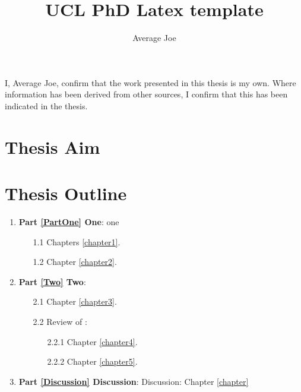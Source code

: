 \documentclass[12pt,phd ,a4paper,oneside]{ucl_thesis}
\title{UCL PhD Latex template}
\author{Average Joe}
\begin{document}
\maketitle
\nobibliography*
\newpage

I, Average Joe, confirm that the work presented in this thesis is my own. Where information has been derived from other sources, I confirm that this has been indicated in the thesis.

\begin{abstract}
	\lipsum
\end{abstract}

\begin{acknowledgements}
	\lipsum
\end{acknowledgements}

\setcounter{tocdepth}{2} 

\tableofcontents
\listoffigures
\listoftables

\chapter*{Thesis Aim}\label{ThesisAim} %
	\lipsum
	
\chapter*{Thesis Outline}\label{ThesisOutline}
	\lipsum
\begin{enumerate}
	\item \textbf{Part \ref{PartOne} One}: one
	\begin{enumerate}
		\item[1.1] Chapters \ref{chapter1}.
		\item[1.2] Chapter \ref{chapter2}.
	\end{enumerate}
	\item \textbf{Part \ref{Two} Two}: 
	\begin{enumerate}
		\item[2.1] Chapter \ref{chapter3}.
		\item[2.2] Review of \cite{Cinelli2017}:
		\begin{enumerate}
			\item[2.2.1] Chapter \ref{chapter4}.
			\item[2.2.2] Chapter \ref{chapter5}.
		\end{enumerate}
	\end{enumerate}
	\item \textbf{Part \ref{Discussion} Discussion}: Discussion: Chapter \ref{chapter}
\end{enumerate}
\end{document}
